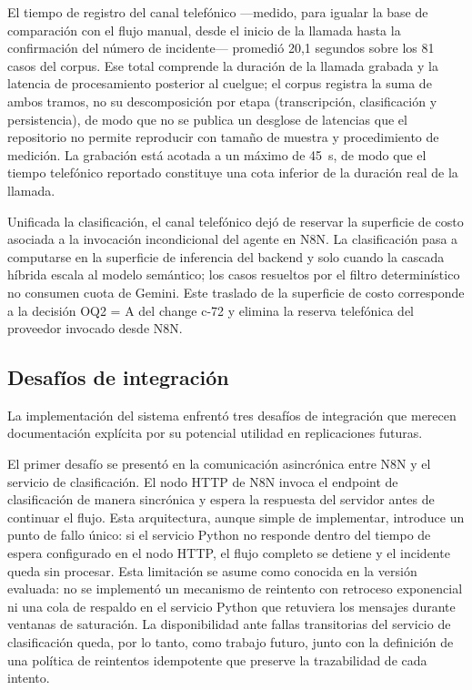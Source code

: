 El tiempo de registro del canal telefónico ---medido, para igualar la base de comparación con el flujo manual, desde el inicio de la llamada hasta la confirmación del número de incidente--- promedió 20,1 segundos sobre los 81 casos del corpus. Ese total comprende la duración de la llamada grabada y la latencia de procesamiento posterior al cuelgue; el corpus registra la suma de ambos tramos, no su descomposición por etapa (transcripción, clasificación y persistencia), de modo que no se publica un desglose de latencias que el repositorio no permite reproducir con tamaño de muestra y procedimiento de medición. La grabación está acotada a un máximo de 45~s, de modo que el tiempo telefónico reportado constituye una cota inferior de la duración real de la llamada.

Unificada la clasificación, el canal telefónico dejó de reservar la superficie de costo asociada a la invocación incondicional del agente en N8N. La clasificación pasa a computarse en la superficie de inferencia del backend y solo cuando la cascada híbrida escala al modelo semántico; los casos resueltos por el filtro determinístico no consumen cuota de Gemini. Este traslado de la superficie de costo corresponde a la decisión OQ2 = A del change c-72 y elimina la reserva telefónica del proveedor invocado desde N8N.

\subsection{Desafíos de integración}\label{subsec:desafios-integracion}

La implementación del sistema enfrentó tres desafíos de integración que merecen documentación explícita por su potencial utilidad en replicaciones futuras.

El primer desafío se presentó en la comunicación asincrónica entre N8N y el servicio de clasificación. El nodo HTTP de N8N invoca el endpoint de clasificación de manera sincrónica y espera la respuesta del servidor antes de continuar el flujo. Esta arquitectura, aunque simple de implementar, introduce un punto de fallo único: si el servicio Python no responde dentro del tiempo de espera configurado en el nodo HTTP, el flujo completo se detiene y el incidente queda sin procesar. Esta limitación se asume como conocida en la versión evaluada: no se implementó un mecanismo de reintento con retroceso exponencial ni una cola de respaldo en el servicio Python que retuviera los mensajes durante ventanas de saturación. La disponibilidad ante fallas transitorias del servicio de clasificación queda, por lo tanto, como trabajo futuro, junto con la definición de una política de reintentos idempotente que preserve la trazabilidad de cada intento.

